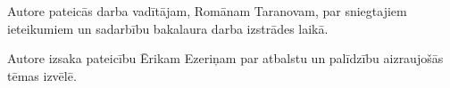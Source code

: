 ﻿Autore pateicās darba vadītājam, Romānam Taranovam, par sniegtajiem ieteikumiem un sadarbību bakalaura darba izstrādes laikā.

Autore izsaka pateicību Ērikam Ezeriņam par atbalstu un  palīdzību aizraujošās tēmas izvēlē.